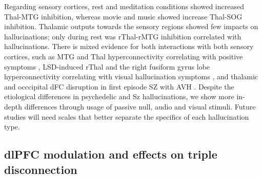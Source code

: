 \documentclass{article}
\begin{document}
Regarding sensory cortices, rest and meditation conditions showed increased Thal-MTG inhibition, whereas movie and music showed increase Thal-SOG inhibition. Thalamic outputs towards the sensory regions showed few impacts on hallucinations; only during rest was rThal-rMTG inhibition correlated with hallucinations. There is mixed evidence for both interactions with both sensory cortices, such as MTG and Thal hyperconnectivity correlating with positive symptoms \citep{ferri_resting-state_2018}, LSD-induced rThal and the right fusiform gyrus lobe hyperconnectivity correlating with visual hallucination symptoms \citep{noauthor_increased_nodate}, and thalamic and occcipital dFC disruption in first episode SZ with AVH \citep{xue_altered_2022}. Despite the etiological differences in psychedelic and Sz hallucinations, we show more in-depth differences through usage of passive null, audio and visual stimuli. Future studies will need scales that better separate the specifics of each hallucination type. 

\subsection{dlPFC modulation and effects on triple disconnection}

\end{document}
